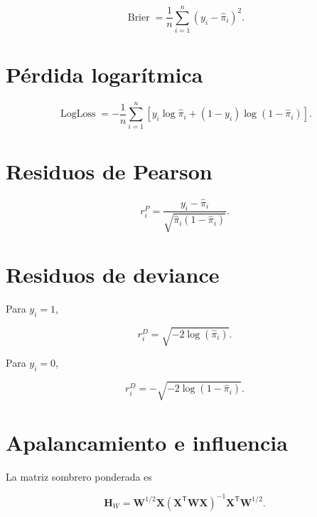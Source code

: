 \documentclass[
  spanish,
  10.5pt,
  letterpaper,
  DIV=11,
  numbers=noendperiod,
  oneside,
  open=any]{scrreprt}
\theoremstyle{definition}
\theoremstyle{definition}
\theoremstyle{plain}
\theoremstyle{remark}
\begin{document}

\[
\operatorname{Brier}
=
\frac{1}{n}
\sum_{i=1}^{n}
(y_i-\widehat{\pi}_i)^2.
\]

\section*{Pérdida logarítmica}\label{puxe9rdida-logaruxedtmica}


\[
\operatorname{LogLoss}
=
-
\frac{1}{n}
\sum_{i=1}^{n}
\left[
y_i\log\widehat{\pi}_i
+
(1-y_i)\log(1-\widehat{\pi}_i)
\right].
\]

\section*{Residuos de Pearson}\label{residuos-de-pearson}


\[
r_i^{P}
=
\frac{
y_i-\widehat{\pi}_i
}{
\sqrt{
\widehat{\pi}_i
(1-\widehat{\pi}_i)
}
}.
\]

\section*{Residuos de deviance}\label{residuos-de-deviance}


Para \(y_i=1\),

\[
r_i^{D}
=
\sqrt{
-2\log(\widehat{\pi}_i)
}.
\]

Para \(y_i=0\),

\[
r_i^{D}
=
-
\sqrt{
-2\log(1-\widehat{\pi}_i)
}.
\]

\section*{Apalancamiento e
influencia}\label{apalancamiento-e-influencia}


La matriz sombrero ponderada es

\[
\mathbf{H}_W
=
\mathbf{W}^{1/2}
\mathbf{X}
\left(
\mathbf{X}^{\mathsf T}
\mathbf{W}
\mathbf{X}
\right)^{-1}
\mathbf{X}^{\mathsf T}
\mathbf{W}^{1/2}.
\]
\end{document}

